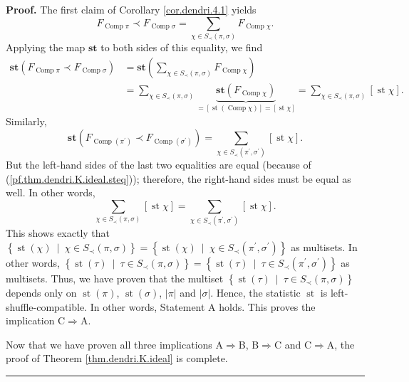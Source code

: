 \documentclass[numbers=enddot,12pt,final,onecolumn,notitlepage]{scrartcl}%
\theoremstyle{definition}
\newenvironment{proof}[1][Proof]{\noindent\textbf{#1.} }{\ \rule{0.5em}{0.5em}}
\let\sumnonlimits\sum
\renewcommand{\sum}{\sumnonlimits\limits}
\begin{document}
\begin{proof}
The first claim of Corollary \ref{cor.dendri.4.1} yields%
\[
F_{\operatorname*{Comp}\pi}\left.  \prec\right.  F_{\operatorname*{Comp}%
\sigma}=\sum_{\chi\in S_{\prec}\left(  \pi,\sigma\right)  }%
F_{\operatorname*{Comp}\chi}.
\]
Applying the map $\mathbf{st}$ to both sides of this equality, we find%
\begin{align*}
\mathbf{st}\left(  F_{\operatorname*{Comp}\pi}\left.  \prec\right.
F_{\operatorname*{Comp}\sigma}\right)   &  =\mathbf{st}\left(  \sum_{\chi\in
S_{\prec}\left(  \pi,\sigma\right)  }F_{\operatorname*{Comp}\chi}\right) \\
&  =\sum_{\chi\in S_{\prec}\left(  \pi,\sigma\right)  }\underbrace{\mathbf{st}%
\left(  F_{\operatorname*{Comp}\chi}\right)  }_{=\left[  \operatorname*{st}%
\left(  \operatorname*{Comp}\chi\right)  \right]  =\left[  \operatorname*{st}%
\chi\right]  }=\sum_{\chi\in S_{\prec}\left(  \pi,\sigma\right)  }\left[
\operatorname*{st}\chi\right]  .
\end{align*}
Similarly,%
\[
\mathbf{st}\left(  F_{\operatorname*{Comp}\left(  \pi^{\prime}\right)
}\left.  \prec\right.  F_{\operatorname*{Comp}\left(  \sigma^{\prime}\right)
}\right)  =\sum_{\chi\in S_{\prec}\left(  \pi^{\prime},\sigma^{\prime}\right)
}\left[  \operatorname*{st}\chi\right]  .
\]
But the left-hand sides of the last two equalities are equal (because of
(\ref{pf.thm.dendri.K.ideal.steq})); therefore, the right-hand sides must be
equal as well. In other words,
\[
\sum_{\chi\in S_{\prec}\left(  \pi,\sigma\right)  }\left[  \operatorname*{st}%
\chi\right]  =\sum_{\chi\in S_{\prec}\left(  \pi^{\prime},\sigma^{\prime
}\right)  }\left[  \operatorname*{st}\chi\right]  .
\]
This shows exactly that $\left\{  \operatorname*{st}\left(  \chi\right)
\ \mid\ \chi\in S_{\prec}\left(  \pi,\sigma\right)  \right\}  =\left\{
\operatorname*{st}\left(  \chi\right)  \ \mid\ \chi\in S_{\prec}\left(
\pi^{\prime},\sigma^{\prime}\right)  \right\}  $ as multisets. In other words,
$\left\{  \operatorname*{st}\left(  \tau\right)  \ \mid\ \tau\in S_{\prec
}\left(  \pi,\sigma\right)  \right\}  =\left\{  \operatorname*{st}\left(
\tau\right)  \ \mid\ \tau\in S_{\prec}\left(  \pi^{\prime},\sigma^{\prime
}\right)  \right\}  $ as multisets. Thus, we have proven that the multiset
$\left\{  \operatorname*{st}\left(  \tau\right)  \ \mid\ \tau\in S_{\prec
}\left(  \pi,\sigma\right)  \right\}  $ depends only on $\operatorname*{st}%
\left(  \pi\right)  $, $\operatorname*{st}\left(  \sigma\right)  $,
$\left\vert \pi\right\vert $ and $\left\vert \sigma\right\vert $. Hence, the
statistic $\operatorname*{st}$ is left-shuffle-compatible. In other words,
Statement A holds. This proves the implication C$\Longrightarrow$A.

Now that we have proven all three implications A$\Longrightarrow$B,
B$\Longrightarrow$C and C$\Longrightarrow$A, the proof of Theorem
\ref{thm.dendri.K.ideal} is complete.
\end{proof}
\end{document}
